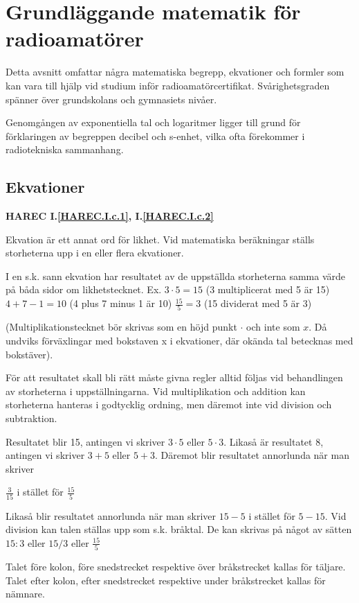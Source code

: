\chapter{Grundläggande matematik för radioamatörer}

Detta avsnitt omfattar några matematiska begrepp, ekvationer och formler som kan
vara till hjälp vid studium inför radioamatörcertifikat. Svårighetsgraden
spänner över grundskolans och gymnasiets nivåer.

Genomgången av exponentiella tal och logaritmer ligger till grund för
förklaringen av begreppen decibel och s-enhet, vilka ofta förekommer i
radiotekniska sammanhang.

\section{Ekvationer}
\textbf{HAREC I.\ref{HAREC.I.c.1}\label{myHAREC.I.c.1}, I.\ref{HAREC.I.c.2}\label{myHAREC.I.c.2}}

Ekvation är ett annat ord för likhet. Vid matematiska beräkningar ställs
storheterna upp i en eller flera ekvationer.

I en s.k. sann ekvation har resultatet av de uppställda storheterna samma värde
på båda sidor om likhetstecknet.
Ex. $3 \cdot 5 = 15$ (3 multiplicerat med 5 är 15)
$4 + 7 - 1 = 10$ (4 plus 7 minus 1 är 10)
$\frac{15}{5} = 3$ (15 dividerat med 5 är 3)

(Multiplikationstecknet bör skrivas som en höjd punkt $\cdot$ och inte som $x$.
Då undviks förväxlingar med bokstaven x i ekvationer, där okända tal betecknas
med bokstäver).

För att resultatet skall bli rätt måste givna regler alltid följas vid
behandlingen av storheterna i uppställningarna. Vid multiplikation och addition
kan storheterna hanteras i godtycklig ordning, men däremot inte vid division och
subtraktion.

Resultatet blir 15, antingen vi skriver $3 \cdot 5$ eller $5 \cdot 3$.
Likaså är resultatet 8, antingen vi skriver $3 + 5$ eller $5 + 3$.
Däremot blir resultatet annorlunda när man skriver

$\frac{3}{15}$ i stället för $\frac{15}{5}$

Likaså blir resultatet annorlunda när man skriver $15 - 5$ i stället för
$5 - 15$. Vid division kan talen ställas upp som s.k. bråktal. De kan skrivas på
något av sätten $15:3$ eller $15/3$ eller $\frac{15}{5}$

Talet före kolon, före snedstrecket respektive över bråkstrecket kallas för
täljare.
Talet efter kolon, efter snedstrecket respektive under bråkstrecket kallas för
nämnare.



